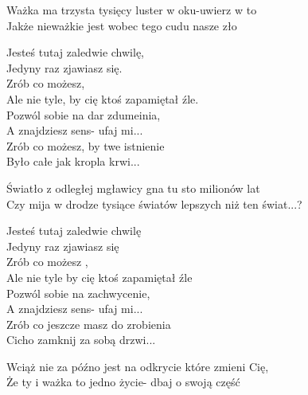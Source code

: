 \begin{text}
    Ważka ma trzysta tysięcy luster w oku-uwierz w to\\
    Jakże nieważkie jest wobec tego cudu nasze zło

    Jesteś tutaj zaledwie chwilę,\\
    Jedyny raz zjawiasz się.\\
    Zrób co możesz,\\
    Ale nie tyle, by cię ktoś zapamiętał źle.\\
    Pozwól sobie na dar zdumeinia,\\
    A znajdziesz sens- ufaj mi...\\
    Zrób co możesz, by twe istnienie\\
    Było całe jak kropla krwi...

    Światło z odległej mgławicy gna tu sto milionów lat\\
    Czy mija w drodze tysiące światów lepszych niż ten świat...?

    Jesteś tutaj zaledwie chwilę\\
    Jedyny raz zjawiasz się\\
    Zrób co możesz ,\\
    Ale nie tyle by cię ktoś zapamiętał źle\\
    Pozwól sobie na zachwycenie,\\
    A znajdziesz sens- ufaj mi...\\
    Zrób co jeszcze masz do zrobienia\\
    Cicho zamknij za sobą drzwi...

    Wciąż nie za późno jest na odkrycie które zmieni Cię,\\
    Że ty i ważka to jedno życie- dbaj o swoją część

\end{text}
\begin{chord}

\end{chord}